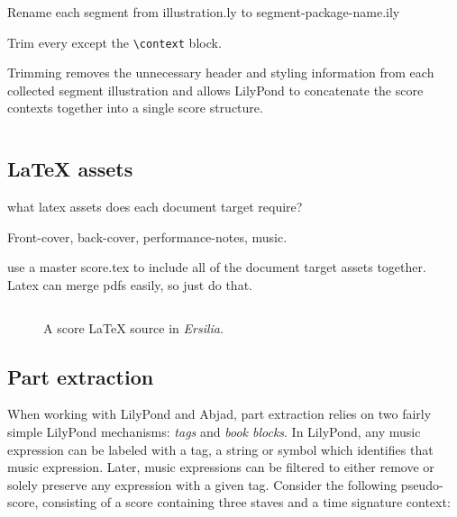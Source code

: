 Rename each segment from illustration.ly to segment-package-name.ily

Trim every except the \texttt{\textbackslash{}context} block.

Trimming removes the unnecessary header and styling information from each
collected segment illustration and allows LilyPond to concatenate the score
contexts together into a single score structure.

\begin{singlespacing}
\vspace{-0.5\baselineskip}
\inputminted{tex}{../../Documents/Scores/ersilia/ersilia/build/segments.ily}
\end{singlespacing}

\subsection{LaTeX assets}
\label{ssec:latex-assets}

what latex assets does each document target require?

Front-cover, back-cover, performance-notes, music.

use a master score.tex to include all of the document target assets together.
Latex can merge pdfs easily, so just do that.

\begin{figure}[h!]
\begin{singlespacing}
\vspace{-0.5\baselineskip}
\inputminted{tex}{../../Documents/Scores/ersilia/ersilia/build/11x17-portrait/ersilia-11x17-portrait-score.tex}
\end{singlespacing}
\vspace{-0.5\baselineskip}
\caption{A score LaTeX source in \emph{Ersilia}.}
\end{figure}

\subsection{Part extraction}
\label{ssec:part-extraction}

When working with LilyPond and Abjad, part extraction relies on two fairly
simple LilyPond mechanisms: \emph{tags} and \emph{book blocks}. In LilyPond,
any music expression can be labeled with a tag, a string or symbol which
identifies that music expression. Later, music expressions can be filtered to
either remove or solely preserve any expression with a given tag. Consider the
following pseudo-score, consisting of a score containing three staves and a
time signature context:

